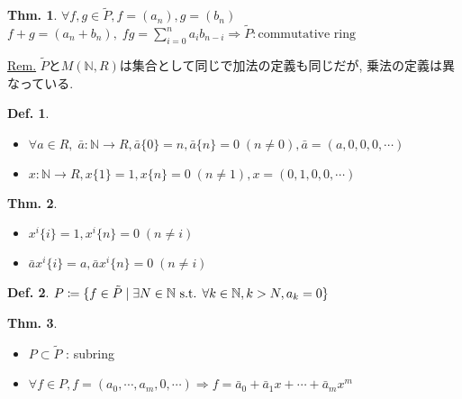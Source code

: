 \documentclass[uplatex,dvipdfmx,9pt]{beamer}
\newcommand{\st}{\text{ s.t. }}
\newcommand{\gt}{\ensuremath >}
\newcommand{\N}{\mathbb{N}}
\theoremstyle{definition} %
\newtheorem{defn}{Def.}[subsection] %
\newtheorem{thm}{Thm.}[subsection] %
\theoremstyle{example}
\begin{document}
    \begin{frame}

      \begin{thm}
        $\forall f, g \in \tilde{P}, f = (a_n), g = (b_n)$ \\
        $f + g = (a_n + b_n), \; fg = \displaystyle\sum_{i = 0}^{n} a_i b_{n - i} \Rightarrow \tilde{P} : \text{commutative ring}$
      \end{thm}
      \underline{Rem.} $\tilde{P}$と$M(\N, R)$は集合として同じで加法の定義も同じだが, 乗法の定義は異なっている.
 
      \begin{defn}
        \begin{itemize}
          \item $\forall a \in R, \; \bar{a}\colon \N \to R, \bar{a}\{0\} = n, \bar{a}\{n\} = 0 \; (n \neq 0), \bar{a} = (a, 0, 0, 0, \cdots)$
          \item $x\colon \N \to R, x\{1\} = 1, x\{n\} = 0 \; (n \neq 1), x = (0, 1, 0, 0, \cdots)$
        \end{itemize}
      \end{defn}

      \begin{thm}
        \begin{itemize}
          \item $x^i\{i\} = 1, x^i\{n\} = 0 \; (n \neq i)$
          \item $\bar{a}x^i\{i\} = a, \bar{a}x^i\{n\} = 0 \; (n \neq i)$
        \end{itemize}
      \end{thm}
    
    \end{frame}

    \begin{frame}
 
      \begin{defn}
        $P \coloneqq \{f \in \tilde{P} \mid \exists N \in \N \st \forall k \in \N, k \gt N, a_k = 0\}$
      \end{defn}
 
      \begin{thm}
        \begin{itemize}
          \item $P \subset \tilde{P}$ : subring
          \item $\forall f \in P, f = (a_0, \cdots, a_m, 0, \cdots)\Rightarrow f = \bar{a}_0 + \bar{a}_1 x + \cdots + \bar{a}_m x^m$
        \end{itemize}
      \end{thm}
      
    \end{frame}
\end{document}
